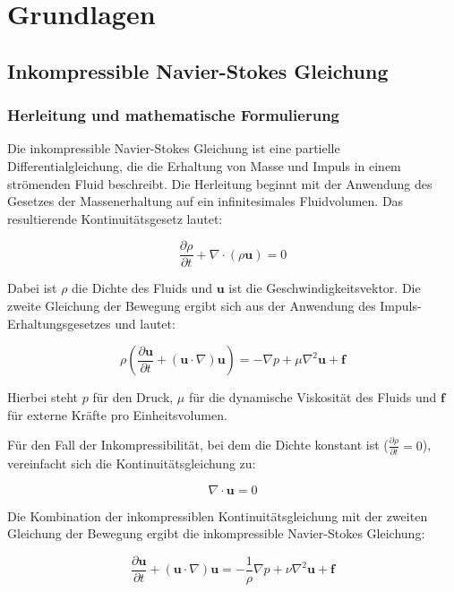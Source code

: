 \section{Grundlagen}
\subsection{Inkompressible Navier-Stokes Gleichung}
\subsubsection{Herleitung und mathematische Formulierung}
Die inkompressible Navier-Stokes Gleichung ist eine partielle Differentialgleichung, die die Erhaltung von Masse und Impuls in einem strömenden Fluid beschreibt. Die Herleitung beginnt mit der Anwendung des Gesetzes der Massenerhaltung auf ein infinitesimales Fluidvolumen. Das resultierende Kontinuitätsgesetz lautet:

\begin{equation}
\frac{\partial \rho}{\partial t} + \nabla \cdot (\rho \mathbf{u}) = 0
\end{equation}

Dabei ist $\rho$ die Dichte des Fluids und $\mathbf{u}$ ist die Geschwindigkeitsvektor. Die zweite Gleichung der Bewegung ergibt sich aus der Anwendung des Impuls-Erhaltungsgesetzes und lautet:

\begin{equation}
\rho \left(\frac{\partial \mathbf{u}}{\partial t} + (\mathbf{u} \cdot \nabla)\mathbf{u}\right) = -\nabla p + \mu \nabla^2 \mathbf{u} + \mathbf{f}
\end{equation}

Hierbei steht $p$ für den Druck, $\mu$ für die dynamische Viskosität des Fluids und $\mathbf{f}$ für externe Kräfte pro Einheitsvolumen.

Für den Fall der Inkompressibilität, bei dem die Dichte konstant ist ($\frac{\partial \rho}{\partial t} = 0$), vereinfacht sich die Kontinuitätsgleichung zu:

\begin{equation}
\nabla \cdot \mathbf{u} = 0
\end{equation}

Die Kombination der inkompressiblen Kontinuitätsgleichung mit der zweiten Gleichung der Bewegung ergibt die inkompressible Navier-Stokes Gleichung:

\begin{equation}
\frac{\partial \mathbf{u}}{\partial t} + (\mathbf{u} \cdot \nabla)\mathbf{u} = -\frac{1}{\rho}\nabla p + \nu \nabla^2 \mathbf{u} + \mathbf{f}
\end{equation}

